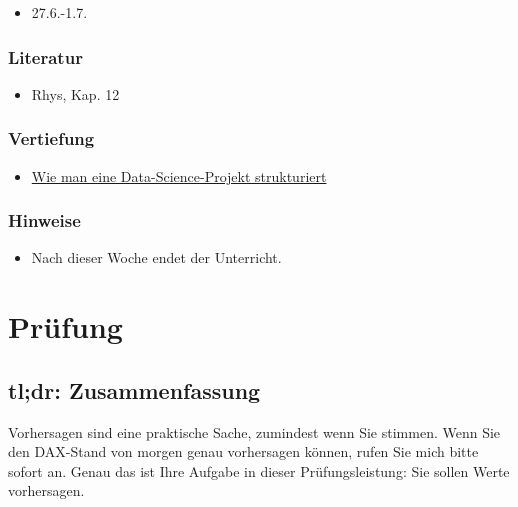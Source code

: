 \documentclass[
]{book}
\providecommand{\tightlist}{%
  \setlength{\itemsep}{0pt}\setlength{\parskip}{0pt}}
\begin{document}
\begin{itemize}
\tightlist
\item
  27.6.-1.7.
\end{itemize}

\hypertarget{literatur-13}{%
\subsection{Literatur}\label{literatur-13}}

\begin{itemize}
\tightlist
\item
  Rhys, Kap. 12
\end{itemize}

\hypertarget{vertiefung-3}{%
\subsection{Vertiefung}\label{vertiefung-3}}

\begin{itemize}
\tightlist
\item
  \href{https://medium.com/swlh/how-to-structure-a-python-based-data-science-project-a-short-tutorial-for-beginners-7e00bff14f56}{Wie man eine Data-Science-Projekt strukturiert}
\end{itemize}

\hypertarget{hinweise-5}{%
\subsection{Hinweise}\label{hinweise-5}}

\begin{itemize}
\tightlist
\item
  Nach dieser Woche endet der Unterricht.
\end{itemize}

\hypertarget{pruxfcfung}{%
\chapter{Prüfung}\label{pruxfcfung}}

\hypertarget{tldr-zusammenfassung}{%
\section{tl;dr: Zusammenfassung}\label{tldr-zusammenfassung}}

Vorhersagen sind eine praktische Sache, zumindest wenn Sie stimmen.
Wenn Sie den DAX-Stand von morgen genau vorhersagen können,
rufen Sie mich bitte sofort an. Genau das ist Ihre Aufgabe in dieser Prüfungsleistung:
Sie sollen Werte vorhersagen.
\end{document}
